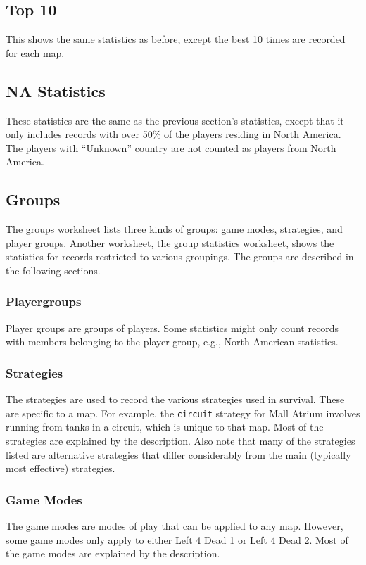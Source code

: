 \subsection{Top 10}
This shows the same statistics as before, except the best 10 times are recorded for each map.

\subsection{NA Statistics}
These statistics are the same as the previous section's statistics, except that it only includes records with over 50\% of the players residing in North America. The players with ``Unknown'' country are not counted as players from North America.

\subsection{Groups} \label{sec:groups}
The groups worksheet lists three kinds of groups: game modes, strategies, and player groups. Another worksheet, the group statistics worksheet, shows the statistics for records restricted to various groupings. The groups are described in the following sections.

\subsubsection{Playergroups}
Player groups are groups of players. Some statistics might only count records with members belonging to the player group, e.g., North American statistics.

\subsubsection{Strategies}
The strategies are used to record the various strategies used in survival. These are specific to a map. For example, the \texttt{circuit} strategy for Mall Atrium involves running from tanks in a circuit, which is unique to that map. Most of the strategies are explained by the description. Also note that many of the strategies listed are alternative strategies that differ considerably from the main (typically most effective) strategies.

\subsubsection{Game Modes}
The game modes are modes of play that can be applied to any map. However, some game modes only apply to either Left 4 Dead 1 or Left 4 Dead 2. Most of the game modes are explained by the description.

